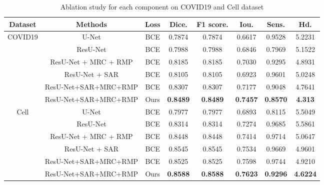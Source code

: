 \documentclass{ieeeaccess}
\begin{document}
    \begin{table}[htbp]
      \vspace{-2mm}
      \begin{center}\small
      \label{ablation-table}
      \begin{tabular}{cccccccc}
        
      \toprule
      Dataset & Methods & Loss & Dice. & F1 score. & Iou. & Sens. & Hd.\\
      \midrule
      \multirow{6}{*}{COVID19} & U-Net                & BCE  & 0.7874          & 0.7874          & 0.6617          & 0.9528          & 5.2231        \\
                               & ResU-Net             & BCE  & 0.7988          & 0.7988          & 0.6846          & 0.7969          & 5.1522        \\
                               & ResU-Net + MRC + RMP & BCE  & 0.8185          & 0.8185          & 0.7030          & 0.9295          & 4.8931        \\
                               & ResU-Net + SAR       & BCE  & 0.8105          & 0.8105          & 0.6923          & 0.9601          & 5.0248        \\
                               & ResU-Net+SAR+MRC+RMP & BCE  & 0.8307          & 0.8307          & 0.7177          & 0.9048          & 4.7641        \\
                               & ResU-Net+SAR+MRC+RMP & Ours & \textbf{0.8489} & \textbf{0.8489} & \textbf{0.7457} & \textbf{0.8570} & \textbf{4.313}\\
      \hline
      \multirow{6}{*}{Cell}    & U-Net                & BCE  & 0.7977          & 0.7977          & 0.6893          & 0.8115          & 5.5049\\
                               & ResU-Net             & BCE  & 0.8314          & 0.8314          & 0.7274          & 0.9685          & 5.5861\\
                               & ResU-Net + MRC + RMP & BCE  & 0.8448          & 0.8448          & 0.7414          & 0.9714          & 5.0647\\
                               & ResU-Net + SAR       & BCE  & 0.8545          & 0.8545          & 0.7534          & 0.9669          & 4.9601\\
                               & ResU-Net+SAR+MRC+RMP & BCE  & 0.8525          & 0.8525          & 0.7598          & 0.9744          & 4.9210\\
                               & ResU-Net+SAR+MRC+RMP & Ours & \textbf{0.8588} & \textbf{0.8588} & \textbf{0.7623} & \textbf{0.9296} & \textbf{4.6224}\\
    \bottomrule    
      \end{tabular}
      \caption{Ablation study for each component on COVID19 and Cell dataset}
    \end{center}
      \vspace{-4mm}
    \end{table}
  
\end{document}
